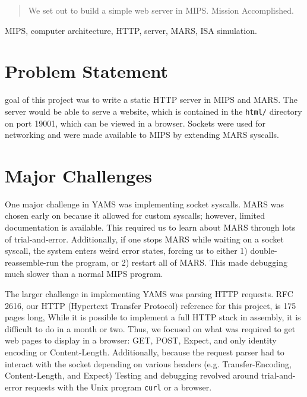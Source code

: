 \documentclass[journal,10pt]{IEEEtran}
\begin{document}
\maketitle

\begin{abstract}
We set out to build a simple web server in MIPS. Mission Accomplished.
\end{abstract}

\begin{IEEEkeywords}
MIPS, computer architecture, HTTP, server, MARS, ISA simulation.
\end{IEEEkeywords}


\section{Problem Statement}
%
%
 goal of this project was to write a static HTTP server in
MIPS and MARS. The server would be able to serve a website, which is contained
in the \texttt{html/} directory on port 19001, which can be viewed in a browser.
Sockets were used for networking and were made available to MIPS by extending
MARS syscalls.


\section{Major Challenges}

One major challenge in YAMS was implementing socket syscalls.
MARS was chosen early on because it allowed for custom syscalls; however,
limited documentation is available. This required us to learn about MARS
through lots of trial-and-error. Additionally, if one stops MARS while
waiting on a socket syscall, the system enters weird error states, forcing
us to either 1) double-reassemble-run the program, or 2) restart all of MARS.
This made debugging much slower than a normal MIPS program.

The larger challenge in implementing YAMS was parsing HTTP requests. RFC
2616\cite{Leach}, our HTTP (Hypertext Transfer Protocol) reference for this
project, is 175 pages long, While it is possible to implement a full HTTP stack
in assembly, it is difficult to do in a month or two. Thus, we focused on what
was required to get web pages to display in a browser: GET, POST, Expect, and
only identity encoding or Content-Length. Additionally, because the request
parser had to interact with the socket depending on various headers (e.g.
Transfer-Encoding, Content-Length, and Expect) Testing and debugging revolved
around trial-and-error requests with the Unix program \texttt{curl} or a browser.
\end{document}

